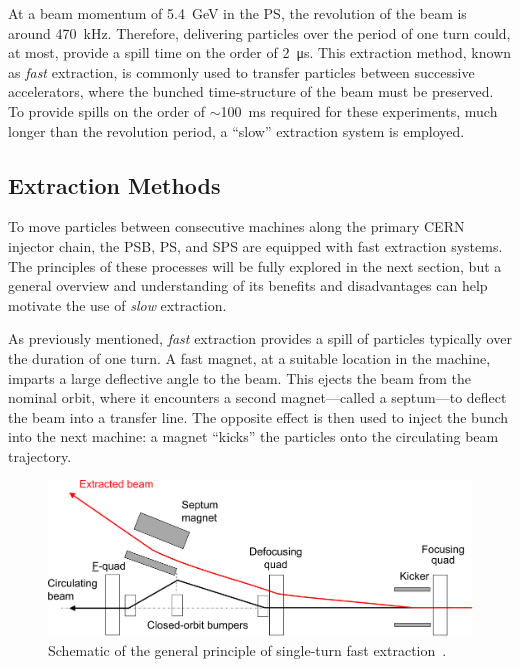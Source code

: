 \documentclass[11pt]{report}
\begin{document}
At a beam momentum of \qty{5.4}{\giga\electronvolt} in the PS, the revolution of the beam is around \qty{470}{kHz}. Therefore, delivering particles over the period of one turn could, at most, provide a spill time on the order of \qty{2}{\micro\second}. This extraction method, known as \textit{fast} extraction, is commonly used to transfer particles between successive accelerators, where the bunched time-structure of the beam must be preserved. To provide spills on the order of $\sim$\qty{100}{\ms} required for these experiments, much longer than the revolution period, a ``slow'' extraction system is employed.

\subsection{Extraction Methods}

To move particles between consecutive machines along the primary CERN injector chain, the PSB, PS, and SPS are equipped with fast extraction systems. The principles of these processes will be fully explored in the next section, but a general overview and understanding of its benefits and disadvantages can help motivate the use of \textit{slow} extraction. 

As previously mentioned, \textit{fast} extraction provides a spill of particles typically over the duration of one turn. A fast magnet, at a suitable location in the machine, imparts a large deflective angle to the beam. This ejects the beam from the nominal orbit, where it encounters a second magnet---called a septum---to deflect the beam into a transfer line. The opposite effect is then used to inject the bunch into the next machine: a magnet ``kicks'' the particles onto the circulating beam trajectory.

\begin{figure}[h]
  \centering
  \includegraphics[width=\linewidth]{fast.png}
  \caption{Schematic of the general principle of single-turn fast extraction~\cite{Fraser:CAS}.}\label{fig:fast_diagram}
\end{figure}
\end{document}
